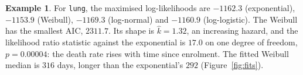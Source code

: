 \documentclass[11pt,a4paper]{article}
\numberwithin{equation}{section}
\theoremstyle{definition}
\newtheorem{exa}[thm]{Example}
\begin{document}
\begin{exa}
\label{ex:lungfamilies}
For \texttt{lung}, the maximised log-likelihoods are $-1162.3$ (exponential), $-1153.9$ (Weibull), $-1169.3$ (log-normal) and $-1160.9$ (log-logistic). The Weibull has the smallest AIC, $2311.7$. Its shape is $\hat k = 1.32$, an increasing hazard, and the likelihood ratio statistic against the exponential is $17.0$ on one degree of freedom,
$p = 0.00004$: the death rate rises with time since enrolment. The fitted Weibull median is $316$ days, longer than the exponential's $292$ (Figure~\ref{fig:fits}).
\end{exa}

\begin{figure}[H]
\centering
{}
\end{figure}
\end{document}
